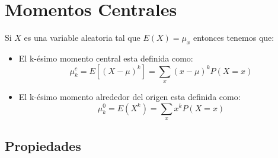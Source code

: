 \documentclass[12pt, fleqn]{report}                             %
\theoremstyle{break}                                            %
\newcommand{\Brackets}[1]{\left[ #1 \right]}                    %
\newcommand{\Wrap}[1]{\left( #1 \right)}                        %
\begin{document}
        \clearpage
        \section{Momentos Centrales}

            Si $X$ es una variable aleatoria tal que $E(X) = \mu_x$ entonces tenemos que:
            \begin{itemize}
                \item 
                    El k-ésimo momento central esta definida como:
                    \begin{equation}
                        \mu_k^c 
                            = E\Brackets{(X - \mu)^k}
                            = \sum_x (x - \mu)^k P(X = x)
                    \end{equation}

                \item 
                    El k-ésimo momento alrededor del origen esta definida como:
                    \begin{equation}
                        \mu_k^0 
                            = E\Wrap{X^k}
                            = \sum_x x^k P(X = x)
                    \end{equation}

            \end{itemize}



            \subsection{Propiedades}
\end{document}
